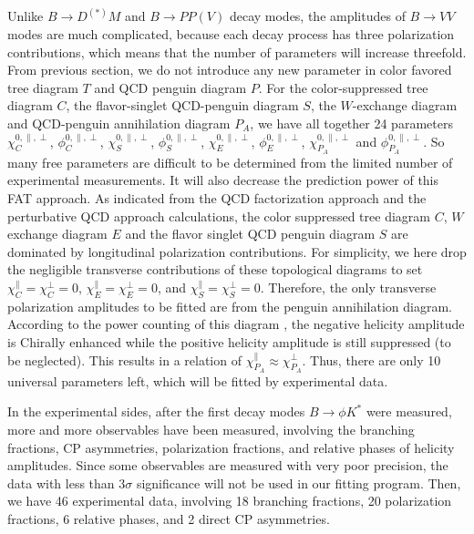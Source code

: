\documentclass[11pt]{article}
\begin{document}
Unlike $B\to D^{(*)}M$ and $B\to PP(V)$ decay modes, the amplitudes of $B\to VV$ modes are much complicated, because each decay process has three polarization contributions, which means that the number of parameters will increase threefold. From previous section, we do not introduce any new parameter in color favored tree diagram $T$ and QCD penguin diagram $P$. For the color-suppressed tree diagram $C$,  the flavor-singlet QCD-penguin diagram $S$,  the $W$-exchange diagram and QCD-penguin  annihilation diagram $P_A$,  we have all together 24 parameters $\chi_C^{0,\parallel,\perp}$, $\phi_C^{0,\parallel,\perp}$, $\chi_{S}^{0,\parallel,\perp}$, $\phi_{S}^{0,\parallel,\perp}$, $\chi_{E}^{0,\parallel,\perp}$,  $\phi_{E}^{0,\parallel,\perp}$,       $\chi_{P_A}^{0,\parallel,\perp}$ and $\phi_{P_A}^{0,\parallel,\perp}$. So many free parameters are difficult to be determined from the limited number of experimental measurements. It will also decrease the prediction power of this FAT approach. As indicated from the QCD factorization approach \cite{Cheng:2009cn,Cheng:2009mu} and the perturbative QCD approach \cite{Zou:2015iwa} calculations, the color suppressed tree diagram $C$, $W$ exchange diagram $E$ and the flavor singlet QCD penguin diagram $S$ are dominated by longitudinal polarization contributions.  For simplicity, we here drop the negligible transverse contributions  of these topological diagrams to set
$\chi_C^{\parallel}=\chi_C^{\perp}=0$,
$\chi_E^{\parallel}=\chi_E^{\perp}=0$, %
and $\chi_{S}^{\parallel}=\chi_{S}^{\perp}=0$. %
Therefore, the only transverse polarization amplitudes to be fitted are from the penguin annihilation diagram. According to the power counting of this diagram \cite{Kagan:2004uw}, the negative helicity amplitude is Chirally enhanced while the positive helicity amplitude is still suppressed (to be neglected). This results in a relation of  $\chi_{P_A}^{\parallel} \approx \chi_{P_A}^{\perp}$.
Thus, there are only 10 universal parameters left, which will be fitted by experimental data.

In the experimental sides, after the first decay modes $B\to \phi K^*$ were measured, more and more observables have been measured, involving the branching fractions, CP asymmetries, polarization fractions, and relative phases of helicity amplitudes. Since some observables are measured with very poor precision, the data with less than $3\sigma$ significance will not be used in our fitting program. Then, we have 46 experimental data, involving 18 branching fractions, 20 polarization fractions, 6 relative phases, and 2 direct CP asymmetries.
\end{document}
